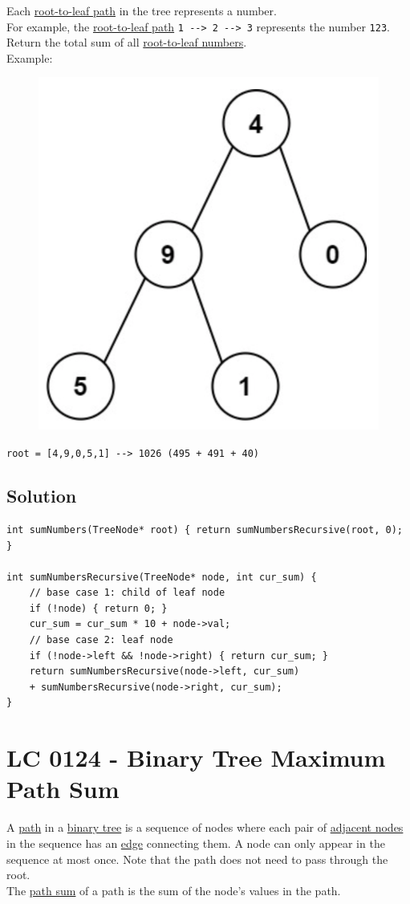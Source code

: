 Each \ul{root-to-leaf path} in the tree represents a number.\\

For example, the \ul{root-to-leaf path} {\colorbox{CodeBackground}{\lstinline|1 --> 2 --> 3|}} represents the number {\colorbox{CodeBackground}{\lstinline|123|}}.\\

Return the total sum of all \ul{root-to-leaf numbers}.\\

Example:
\begin{figure}[H]
	\centering
	\includegraphics[width=0.23\linewidth]{images/lc0129_example}
	\label{fig:lc0129example}
\end{figure}
{\colorbox{CodeBackground}{\lstinline|root = [4,9,0,5,1] --> 1026 (495 + 491 + 40)|}}

\subsection*{Solution}
\begin{lstlisting}
int sumNumbers(TreeNode* root) { return sumNumbersRecursive(root, 0); }

int sumNumbersRecursive(TreeNode* node, int cur_sum) {
	// base case 1: child of leaf node
	if (!node) { return 0; }
	cur_sum = cur_sum * 10 + node->val;
	// base case 2: leaf node
	if (!node->left && !node->right) { return cur_sum; }
	return sumNumbersRecursive(node->left, cur_sum) 
	+ sumNumbersRecursive(node->right, cur_sum);
}
\end{lstlisting}

\section{LC 0124 - Binary Tree Maximum Path Sum}\label{lc0124}
A \ul{path} in a \ul{binary tree} is a sequence of nodes where each pair of \ul{adjacent nodes} in the sequence has an \ul{edge} connecting them. A node can only appear in the sequence at most once. Note that the path does not need to pass through the root.\\

The \ul{path sum} of a path is the sum of the node's values in the path.\\

